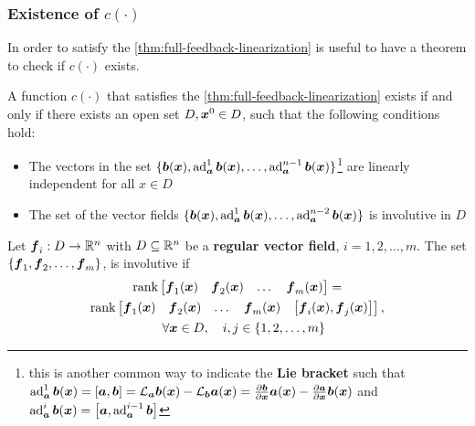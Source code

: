 \subsubsection{Existence of $c(\cdot)$}

In order to satisfy the \cref{thm:full-feedback-linearization} is useful to have a theorem to check if $c(\cdot)$ exists.

\begin{theorem}
    A function $c(\cdot)$ that satisfies the \cref{thm:full-feedback-linearization} exists if and only if there exists an open set $D, \boldsymbol{x}^0 \in D$, such that the following conditions hold:

    \begin{itemize}
        \item The vectors in the set $\{\boldsymbol{b}(\boldsymbol{x}), \operatorname{ad}_{\boldsymbol{a}}^1 \boldsymbol{b}(\boldsymbol{x}), \dots, \operatorname{ad}_{\boldsymbol{a}}^{n-1} \boldsymbol{b}(\boldsymbol{x}) \}$\footnote{this is another common way to indicate the \textbf{Lie bracket} such that $\operatorname{ad}_{\boldsymbol{a}}^{1}\boldsymbol{b}(\boldsymbol{x}) = \left[ \boldsymbol{a}, \boldsymbol{b} \right] = \mathcal{L}_{\boldsymbol{a}}\boldsymbol{b}(\boldsymbol{x}) - \mathcal{L}_{\boldsymbol{b}}\boldsymbol{a}(\boldsymbol{x}) = \frac{\partial \boldsymbol{b}}{\partial \boldsymbol{x}}\boldsymbol{a}(\boldsymbol{x}) - \frac{\partial \boldsymbol{a}}{\partial \boldsymbol{x}}\boldsymbol{b}(\boldsymbol{x})$ and $\operatorname{ad}_{\boldsymbol{a}}^{i}\boldsymbol{b}(\boldsymbol{x}) = \left[ \boldsymbol{a}, \operatorname{ad}_{\boldsymbol{a}}^{i-1}\boldsymbol{b} \right]$} are linearly independent for all $x \in D$
        \item The set of the vector fields $\{\boldsymbol{b}(\boldsymbol{x}), \operatorname{ad}_{\boldsymbol{a}}^1 \boldsymbol{b}(\boldsymbol{x}), \dots, \operatorname{ad}_{\boldsymbol{a}}^{n-2} \boldsymbol{b}(\boldsymbol{x}) \}$ is involutive in $D$
    \end{itemize}
\end{theorem}

\begin{definition}[Involutive]
Let $\boldsymbol{f}_i : D \to \mathbb{R}^n$ with $D \subseteq \mathbb{R}^n$ be a \textbf{regular vector field}, $i= 1,2,\dots, m$.
    The set $\{\boldsymbol{f}_1, \boldsymbol{f}_2, \dots, \boldsymbol{f}_m\}$, is involutive if
    \begin{multline*}
        \operatorname{rank} \begin{bmatrix} \boldsymbol{f}_1(\boldsymbol{x}) & \boldsymbol{f}_2(\boldsymbol{x}) & \dots & \boldsymbol{f}_m(\boldsymbol{x}) \end{bmatrix} = \\
        \operatorname{rank} \begin{bmatrix} \boldsymbol{f}_1(\boldsymbol{x}) & \boldsymbol{f}_2(\boldsymbol{x}) & \dots & \boldsymbol{f}_m(\boldsymbol{x}) & \left[ \boldsymbol{f}_i(\boldsymbol{x}), \boldsymbol{f}_j(\boldsymbol{x}) \right] \end{bmatrix}, \\
        \quad \forall \boldsymbol{x} \in D, \quad i,j \in \{1,2,\dots, m\}
    \end{multline*}
\end{definition}

